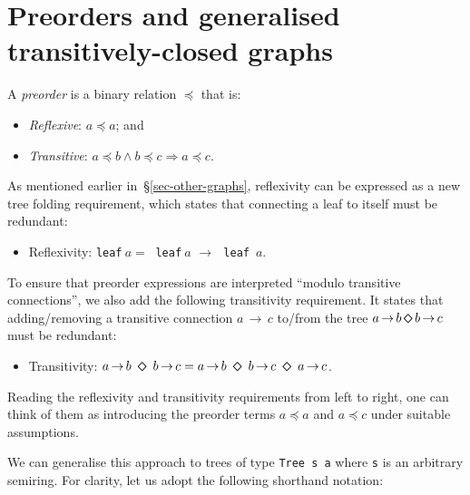 \documentclass[english,submission]{programming}
\newcommand{\hcode}[1]{{\color{darkblue} \lstinline[keywordstyle={}]|#1|}} %
\newcommand{\dia}{\,\text{\raisebox{-0.3mm}{\Large $\diamond$}}\,}
\newcommand{\arr}{\,\text{$\rightarrow$}\,}
\begin{document}
\section{Preorders and generalised transitively-closed graphs}\label{sec-preorder}

A \emph{preorder} is a binary relation $\preceq$ that is:

\begin{itemize}
    \item \emph{Reflexive}: $a \preceq a$; and
    \item \emph{Transitive}: $a \preceq b \wedge b \preceq c \Rightarrow a \preceq c$.
\end{itemize}

\noindent
As mentioned earlier in~\S\ref{sec-other-graphs}, reflexivity can be expressed
as a new tree folding requirement, which states that connecting a leaf to itself
must be redundant:

\begin{itemize}
    \item Reflexivity:
    \hcode{leaf}$~a =~$\hcode{leaf}$~a\,\arr\,$\hcode{leaf}~$a$.
\end{itemize}

\noindent
To ensure that preorder expressions are interpreted
``modulo transitive connections'', we also add the following transitivity
requirement. It states that adding/removing a transitive connection $a \arr c$
to/from the tree $a \arr b \dia b \arr c$ must be redundant:

\begin{itemize}
    \item Transitivity: $a \arr b\ \dia\ b \arr c = a \arr b\ \dia\ b \arr c\ \dia\ a \arr c$.
\end{itemize}

\noindent
Reading the reflexivity and transitivity requirements from left to right, one
can think of them as introducing the preorder terms $a \preceq a$ and
$a \preceq c$ under suitable assumptions.

We can generalise this approach to trees of type \hcode{Tree s a} where
\hcode{s} is an arbitrary semiring. For clarity, let us adopt the following
shorthand notation:
\end{document}
